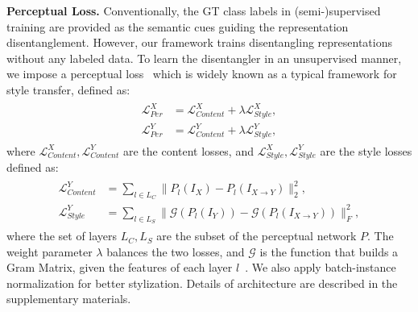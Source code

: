 \documentclass[final]{cvpr}
\begin{document}
\textbf{Perceptual Loss.} \quad
Conventionally, the GT class labels in (semi-)supervised training are provided as the semantic cues guiding the representation disentanglement.
However, our framework trains disentangling representations without any labeled data.
To learn the disentangler in an unsupervised manner, we impose a perceptual loss~\cite{johnson2016perceptual} which is widely known as a typical framework for style transfer, defined as:
\begin{gather}
\begin{split}
    \mathcal{L}_{Per}^X & = \mathcal{L}_{Content}^X + \lambda\mathcal{L}_{Style}^X, \\
    \mathcal{L}_{Per}^Y & = \mathcal{L}_{Content}^Y + \lambda\mathcal{L}_{Style}^Y, 
\end{split}
\end{gather}
where $\mathcal{L}_{Content}^X, \mathcal{L}_{Content}^Y$ are the content losses, and $\mathcal{L}_{Style}^X, \mathcal{L}_{Style}^Y$ are the style losses defined as:
\begin{gather}
\begin{split}
    \mathcal{L}_{Content}^Y & = \sum_{l \in L_C} \lVert P_l(I_X) - P_l(I_{X \to Y}) \rVert _2^2, \\
    \mathcal{L}_{Style}^Y & = \sum_{l \in L_S} \lVert \mathcal{G}(P_l(I_Y)) - \mathcal{G}(P_l(I_{X \to Y})) \rVert _F^2,
\end{split}
\end{gather}
where the set of layers $L_C, L_S$ are the subset of the perceptual network $P$. The weight parameter $\lambda$ balances the two losses, and $\mathcal{G}$ is the function that builds a Gram Matrix, given the features of each layer $l$~\cite{gatys2015texture}.
We also apply batch-instance normalization \cite{nam2018batch} for better stylization.
Details of architecture are described in the supplementary materials.
\end{document}
